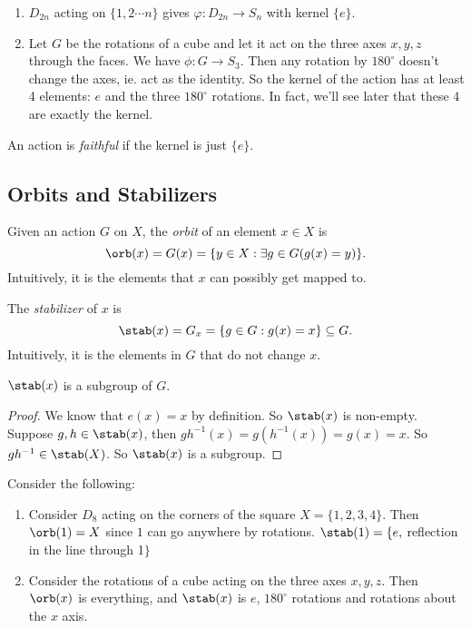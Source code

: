 \documentclass[a4paper]{article}
\begin{document}
\begin{eg}\leavevmode
  \begin{enumerate}
    \item $D_{2n}$ acting on $\{1, 2\cdots n\}$ gives $\varphi: D_{2n}\to S_n$ with kernel $\{e\}$.
    \item Let $G$ be the rotations of a cube and let it act on the three axes $x, y, z$ through the faces. We have $\phi: G\to S_3$. Then any rotation by $180^\circ$ doesn't change the axes, ie. act as the identity. So the kernel of the action has at least 4 elements: $e$ and the three $180^\circ$ rotations. In fact, we'll see later that these 4 are exactly the kernel.
  \end{enumerate}
\end{eg}

\begin{defi}
  An action is \emph{faithful} if the kernel is just $\{e\}$.
\end{defi}

\subsection{Orbits and Stabilizers}
\begin{defi}
  Given an action $G$ on $X$, the \emph{orbit} of an element $x\in X$ is
  \[
    \orb (x) = G(x) = \{y\in X: \exists g\in G(g(x) = y)\}.
  \]
  Intuitively, it is the elements that $x$ can possibly get mapped to.
\end{defi}
\begin{defi}
  The \emph{stabilizer} of $x$ is
  \[
    \stab(x) = G_x = \{g\in G: g(x) = x\}\subseteq G.
  \]
  Intuitively, it is the elements in $G$ that do not change $x$.
\end{defi}

\begin{lemma}
  $\stab(x)$ is a subgroup of $G$.
\end{lemma}

\begin{proof}
  We know that $e(x) = x$ by definition. So $\stab(x)$ is non-empty. Suppose $g, h\in \stab(x)$, then $gh^{-1}(x) = g(h^{-1}(x)) = g(x) = x$. So $gh^{-1}\in \stab (X)$. So $\stab (x)$ is a subgroup.
\end{proof}

\begin{eg}
  Consider the following:
  \begin{enumerate}
    \item Consider $D_8$ acting on the corners of the square $X = \{1, 2, 3, 4\}$. Then $\orb(1) = X$ since $1$ can go anywhere by rotations. $\stab(1) = \{e, $ reflection in the line through 1$\}$
    \item Consider the rotations of a cube acting on the three axes $x, y, z$. Then $\orb(x)$ is everything, and $\stab(x)$ is $e$, $180^\circ$ rotations and rotations about the $x$ axis.
  \end{enumerate}
\end{eg}
\end{document}
